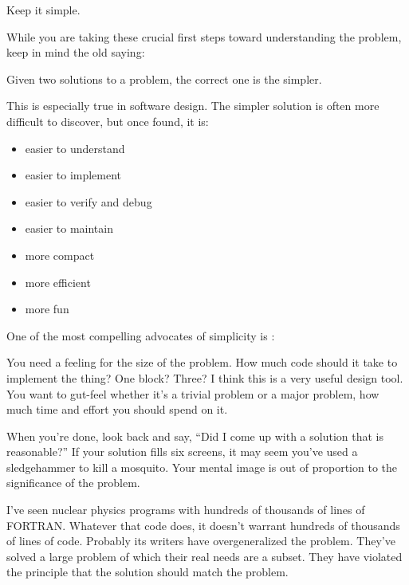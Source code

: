 \begin{tip}
Keep it simple.
\end{tip}

\noindent While you are taking these crucial first steps toward
understanding the problem, keep in mind the old saying:

\begin{tfquot}
Given two solutions to a problem, the correct one is the simpler.
\end{tfquot}
This is especially true in software design. The simpler solution is often
more difficult to discover, but once found, it is:

\begin{itemize}
\item easier to understand
\item easier to implement
\item easier to verify and debug
\item easier to maintain
\item more compact
\item more efficient
\item more fun
\end{itemize}

\begin{interview}
One of the most compelling advocates of simplicity is
:

\begin{tfquot}
You need a feeling for the size of the problem. How much code should
it take to implement the thing? One block? Three? I think this is a
very useful design tool. You want to gut-feel whether it's a trivial
problem or a major problem, how much time and effort you should spend
on it.

When you're done, look back and say, ``Did I come up with a solution
that is reasonable?'' If your solution fills six screens, it may seem
you've used a sledgehammer to kill a mosquito. Your mental image is
out of proportion to the significance of the problem.

I've seen nuclear physics programs with hundreds of thousands of lines
of FORTRAN. Whatever that code does, it doesn't warrant hundreds of
thousands of lines of code. Probably its writers have overgeneralized
the problem. They've solved a large problem of which their real needs
are a subset. They have violated the principle that the solution
should match the problem.
\end{tfquot}
\end{interview}

